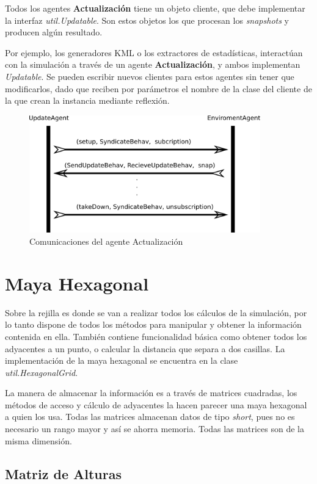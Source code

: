 Todos los agentes {\bf Actualización} tiene un objeto cliente, que debe
implementar la interfaz {\em util.Updatable}. Son estos objetos los que
procesan los {\em snapshots} y producen algún resultado.

Por ejemplo, los generadores KML o los extractores de estadísticas, interactúan
con la simulación a través de un agente {\bf Actualización}, y ambos
implementan {\em Updatable}. Se pueden escribir nuevos clientes para estos
agentes sin tener que modificarlos, dado que reciben por parámetros el nombre
de la clase del cliente de la que crean la instancia mediante reflexión.

\begin{figure}[H]
 \centering
 \includegraphics[width=100mm]{figuras/cap5/com_update.png}
 \caption{Comunicaciones del agente Actualización}
\end{figure}

\section*{Maya Hexagonal}

Sobre la rejilla es donde se van a realizar todos los cálculos de la simulación,
por lo tanto dispone de todos los métodos para manipular y obtener la
información contenida en ella. También contiene funcionalidad básica como
obtener todos los adyacentes a un punto, o calcular la distancia que separa a
dos casillas. La implementación de la maya hexagonal se encuentra en la clase
{\em util.HexagonalGrid}.

La manera de almacenar la información es a través de matrices cuadradas, los
métodos de acceso y cálculo de adyacentes la hacen parecer una maya hexagonal a
quien los usa. Todas las matrices almacenan datos de tipo {\em short}, pues no
es necesario un rango mayor y así se ahorra memoria. Todas las matrices son de
la misma dimensión.

\subsection*{Matriz de Alturas}

